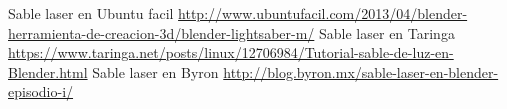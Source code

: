 % 

\begin{thebibliography}{99}

	\emph{} Sable laser en Ubuntu facil \url{http://www.ubuntufacil.com/2013/04/blender-herramienta-de-creacion-3d/blender-lightsaber-m/}
	\emph{} Sable laser en Taringa \url{https://www.taringa.net/posts/linux/12706984/Tutorial-sable-de-luz-en-Blender.html}
	\emph{} Sable laser en Byron \url{http://blog.byron.mx/sable-laser-en-blender-episodio-i/}

\end{thebibliography}
